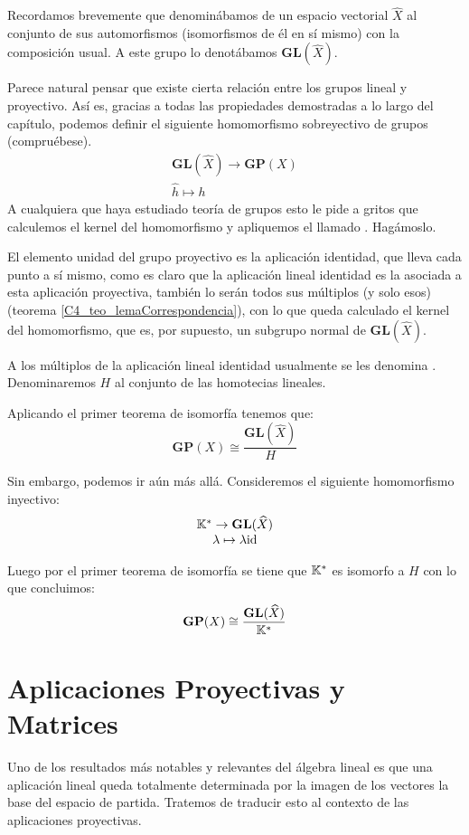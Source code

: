 Recordamos brevemente que denominábamos  de un espacio vectorial $\widehat{X}$ al conjunto de sus automorfismos (isomorfismos de él en sí mismo) con la composición usual. A este grupo lo denotábamos $\mathbf{GL}(\widehat{X})$.

Parece natural pensar que existe cierta relación entre los grupos lineal y proyectivo. Así es, gracias a todas las propiedades demostradas a lo largo del capítulo, podemos definir el siguiente homomorfismo sobreyectivo de grupos (compruébese).
\[\begin{array}{c}
	\mathbf{GL}(\widehat{X})\to\mathbf{GP}(X)\\
	\widehat{h}\mapsto h
\end{array}\]
A cualquiera que haya estudiado teoría de grupos esto le pide a gritos que calculemos el kernel del homomorfismo y apliquemos el llamado . Hagámoslo.

El elemento unidad del grupo proyectivo es la aplicación identidad, que lleva cada punto a sí mismo, como es claro que la aplicación lineal identidad es la asociada a esta aplicación proyectiva, también lo serán todos sus múltiplos (y solo esos) (teorema \ref{C4_teo_lemaCorrespondencia}), con lo que queda calculado el kernel del homomorfismo, que es, por supuesto, un subgrupo normal de $\mathbf{GL}(\widehat{X})$.

A los múltiplos de la aplicación lineal identidad usualmente se les denomina . Denominaremos $H$ al conjunto de las homotecias lineales.

Aplicando el primer teorema de isomorfía tenemos que:
\[\mathbf{GP}(X)\cong\frac{\mathbf{GL}(\widehat{X})}{H}\]

Sin embargo, podemos ir aún más allá. Consideremos el siguiente homomorfismo inyectivo:
\[\begin{array}{c}
\mathbb{K}^*\to\mathbf{GL}(\widehat{X})\\
\lambda\mapsto\lambda\mathrm{id}
\end{array}\]

Luego por el primer teorema de isomorfía se tiene que $\mathbb{K}^*$ es isomorfo a $H$ con lo que concluimos:
\begin{equation}\mathbf{GP}(X)\cong\frac{\mathbf{GL}(\widehat{X})}{\mathbb{K}^*}\end{equation}
\section{Aplicaciones Proyectivas y Matrices}
Uno de los resultados más notables y relevantes del álgebra lineal es que una aplicación lineal queda totalmente determinada por la imagen de los vectores la base del espacio de partida. Tratemos de traducir esto al contexto de las aplicaciones proyectivas.


